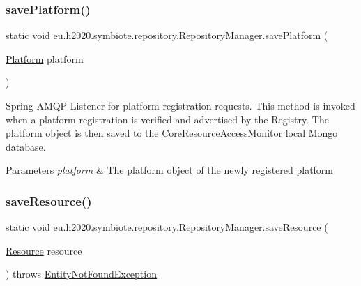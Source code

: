 \subsubsection{\texorpdfstring{save\+Platform()}{savePlatform()}}
{\footnotesize\ttfamily static void eu.\+h2020.\+symbiote.\+repository.\+Repository\+Manager.\+save\+Platform (\begin{DoxyParamCaption}\item[{\hyperlink{classeu_1_1h2020_1_1symbiote_1_1model_1_1Platform}{Platform}}]{platform }\end{DoxyParamCaption})\hspace{0.3cm}{\ttfamily [static]}}

Spring A\+M\+QP Listener for platform registration requests. This method is invoked when a platform registration is verified and advertised by the Registry. The platform object is then saved to the Core\+Resource\+Access\+Monitor local Mongo database.


\begin{DoxyParams}{Parameters}
{\em platform} & The platform object of the newly registered platform \\
\hline
\end{DoxyParams}
\mbox{\label{classeu_1_1h2020_1_1symbiote_1_1repository_1_1RepositoryManager_a82eb799665755be27795dafdfe90e0b3}} 
\subsubsection{\texorpdfstring{save\+Resource()}{saveResource()}}
{\footnotesize\ttfamily static void eu.\+h2020.\+symbiote.\+repository.\+Repository\+Manager.\+save\+Resource (\begin{DoxyParamCaption}\item[{\hyperlink{classeu_1_1h2020_1_1symbiote_1_1model_1_1Resource}{Resource}}]{resource }\end{DoxyParamCaption}) throws \hyperlink{classeu_1_1h2020_1_1symbiote_1_1exception_1_1EntityNotFoundException}{Entity\+Not\+Found\+Exception}\hspace{0.3cm}{\ttfamily [static]}}

